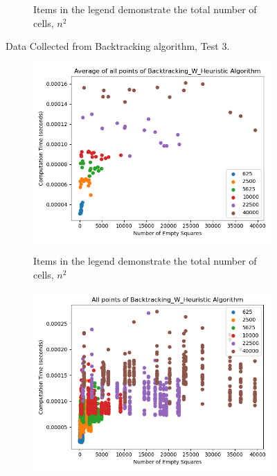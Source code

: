 \documentclass{article}
\begin{document}
\begin{figure}[!h]
\begin{subfigure}{0.4\textwidth}
		\label{Test 3: Scatter plot of all collected points}
		\caption{Items in the legend demonstrate the total number of cells, $n^2$}
	\end{subfigure}
	\caption{Data Collected from Backtracking algorithm, Test 3.}
\end{figure}

\bigskip




\bigskip

\begin{figure}[!h]
	\centering
	\begin{subfigure}{0.4\textwidth}
		\centering
		\includegraphics[scale=0.4]{scatter_avg_Backtracking_w_Heuristic-3.png}
		\label{Test 3: Average of all points}
		\caption{Items in the legend demonstrate the total number of cells, $n^2$}
	\end{subfigure}
	\hfill
	\begin{subfigure}{0.4\textwidth}
		\centering
		\includegraphics[scale=0.4]{scatter_Backtracking_w_Heuristic-3.png}

\end{subfigure}
\end{figure}
\end{document}
